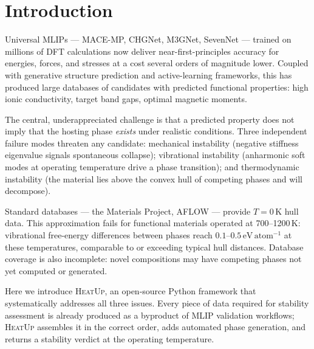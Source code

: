 \documentclass[twocolumn,10pt]{article}
\newcommand{\tp}{\textsc{HeatUp}}
\begin{document}
\section*{Introduction}

Universal MLIPs --- MACE-MP\cite{batatia2024maceuniversal}, CHGNet\cite{deng2023chgnet},
M3GNet\cite{chen2022universal}, SevenNet\cite{park2024sevennet} --- trained on millions
of DFT calculations now deliver near-first-principles accuracy for energies, forces,
and stresses at a cost several orders of magnitude lower.
Coupled with generative structure prediction\cite{xie2022crystal,yang2024mattersim}
and active-learning frameworks\cite{vandermause2020fly,lopezalvarez2024sse}, this has
produced large databases of candidates with predicted functional properties: high ionic
conductivity, target band gaps, optimal magnetic moments.

The central, underappreciated challenge is that a predicted property does not imply
that the hosting phase \emph{exists} under realistic conditions.
Three independent failure modes threaten any candidate:
mechanical instability (negative stiffness eigenvalue signals spontaneous
collapse\cite{born1954dynamical});
vibrational instability (anharmonic soft modes at operating temperature drive a
phase transition\cite{hellman2011lattice});
and thermodynamic instability (the material lies above the convex hull of competing
phases and will decompose\cite{sun2016thermodynamic}).

Standard databases --- the Materials Project\cite{jain2013commentary},
AFLOW\cite{curtarolo2012aflow} --- provide $T = 0\,\mathrm{K}$ hull data.
This approximation fails for functional materials operated at 700--1200\,K:
vibrational free-energy differences between phases reach $0.1$--$0.5\,\mathrm{eV\,atom^{-1}}$
at these temperatures\cite{wang2015design}, comparable to or exceeding typical hull
distances. Database coverage is also incomplete: novel compositions may have competing
phases not yet computed or generated\cite{sun2016thermodynamic}.

Here we introduce \tp{}, an open-source Python framework that systematically addresses
all three issues.
Every piece of data required for stability assessment is already produced as a byproduct
of MLIP validation workflows; \tp{} assembles it in the correct order, adds automated
phase generation, and returns a stability verdict at the operating temperature.
\end{document}
